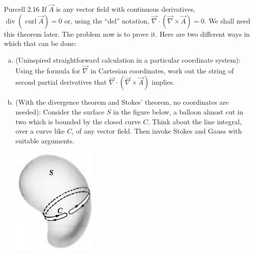 \documentclass{esg8022pset}
\begin{document}
\begin{problem}{Purcell 2.16}
  If $\vec A$ is any vector field with continuous derivatives, $\operatorname{div}(\operatorname{curl}\vec A) = 0$ or, using the ``del'' notation, $\vec \nabla \cdot (\vec \nabla \times \vec A) = 0$. We shall need this theorem later. The problem now is to prove it. Here are two different ways in which that can be done: 
  \begin{enumerate}[(a)]
    \item (Uninspired straightforward calculation in a particular coordinate system): Using the formula for $\vec\nabla$ in Cartesian coordinates, work out the string of second partial derivatives that $\vec \nabla \cdot (\vec \nabla \times \vec A)$ implies. 
    \item (With the divergence theorem and Stokes' theorem, no coordinates are needed): Consider the surface $S$ in the figure below, a balloon almost cut in two which is bounded by the closed curve $C$. Think about the line integral, over a curve like $C$, of any vector field. Then invoke Stokes and Gauss with suitable arguments.
      \begin{center}\includegraphics[width=0.33\textwidth]{ps03_02}\end{center}
  \end{enumerate}
\end{problem}
\end{document}
